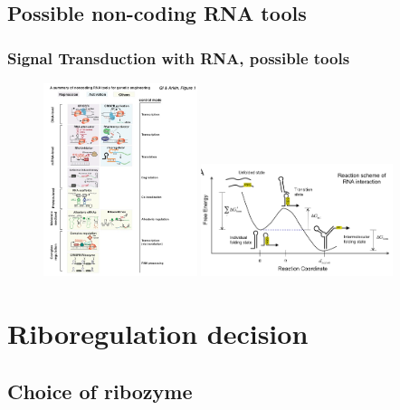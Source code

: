 \documentclass{beamer}
\begin{document}
\subsection{Possible non-coding RNA tools}
\begin{frame}
\frametitle{Signal Transduction with RNA, possible tools}

\begin{figure}
\includegraphics[width=0.4\textwidth]{riboregulation.png}
\hfill
\includegraphics[width=0.5\textwidth]{energy_riboregulation.png}
\end{figure}
\end{frame}

\section{Riboregulation decision}
\subsection{Choice of ribozyme}
\end{document}

